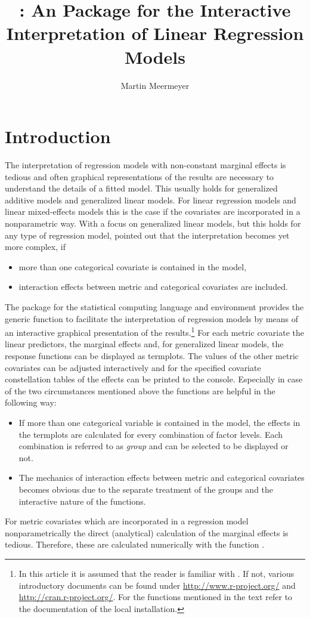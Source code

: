\documentclass[nojss]{jss}
\author{Martin Meermeyer}
\title{\pkg{LinRegInteractive}: An \proglang{R} Package for the Interactive Interpretation of Linear Regression Models}
\begin{document}
\section{Introduction} \label{sec-intro}
The interpretation of regression models with non-constant marginal effects is tedious and often graphical representations of the results are necessary to understand the details of a fitted model. This usually holds for generalized additive models and generalized linear models. For linear regression models and linear mixed-effects models this is the case if the covariates are incorporated in a nonparametric way.  With a focus on generalized linear models, but this holds for any type of regression model, \citet{Hoet2007} pointed out that the interpretation becomes yet more complex, if
\begin{itemize} [leftmargin=1cm, rightmargin=0.5cm, label=$\bullet$]
\item more than one categorical covariate is contained in the model,
\item interaction effects between metric and categorical covariates are included.
\end{itemize}


The package  \citep{Meer2014} for the statistical computing language and environment  \citep{RCore2014} provides the generic function  to facilitate the interpretation of regression models by means of an interactive graphical presentation of the results.\footnote{In this article it is assumed that the reader is familiar with . If not, various introductory documents can be found under \url{http://www.r-project.org/} and \url{http://cran.r-project.org/}. For the functions mentioned in the text refer to the documentation of the local  installation.} For each metric covariate the linear predictors, the marginal effects and, for generalized linear models, the response functions can be displayed as termplots. The values of the other metric covariates can be adjusted interactively and for the specified covariate constellation tables of the effects can be printed to the console. Especially in case of the two circumstances mentioned above the functions are helpful in the following way:
\begin{itemize} [leftmargin=1cm, rightmargin=0.5cm, label=$\bullet$]
\item If more than one categorical variable is contained in the model, the effects in the termplots are calculated for every combination of factor levels. Each combination is referred to as \emph{group} and can be selected to be displayed or not.
\item The mechanics of interaction effects between metric and categorical covariates becomes obvious due to the separate treatment of the groups  and the interactive nature of the functions.
\end{itemize}
For metric covariates which are incorporated in a regression model nonparametrically the direct (analytical) calculation of the marginal effects is tedious. Therefore, these are calculated numerically with the function . 
\end{document}
